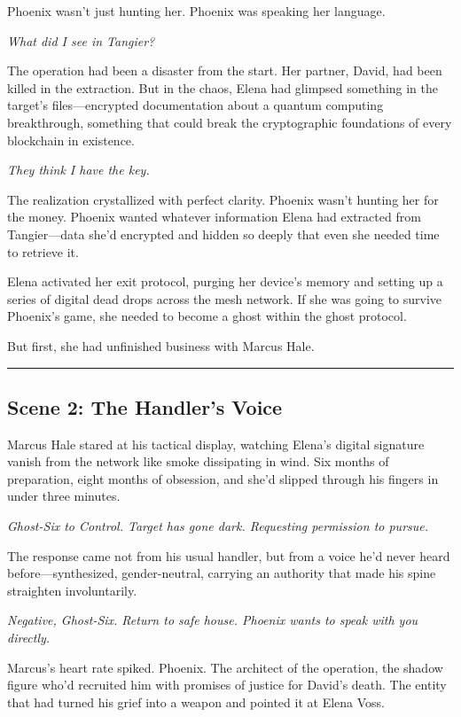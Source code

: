 Phoenix wasn't just hunting her. Phoenix was speaking her language.

\emph{What did I see in Tangier?}

The operation had been a disaster from the start. Her partner, David, had been killed in the extraction. But in the chaos, Elena had glimpsed something in the target's files---encrypted documentation about a quantum computing breakthrough, something that could break the cryptographic foundations of every blockchain in existence.

\emph{They think I have the key.}

The realization crystallized with perfect clarity. Phoenix wasn't hunting her for the money. Phoenix wanted whatever information Elena had extracted from Tangier---data she'd encrypted and hidden so deeply that even she needed time to retrieve it.

Elena activated her exit protocol, purging her device's memory and setting up a series of digital dead drops across the mesh network. If she was going to survive Phoenix's game, she needed to become a ghost within the ghost protocol.

But first, she had unfinished business with Marcus Hale.

\begin{center}\rule{0.5\linewidth}{0.5pt}\end{center}

\hypertarget{scene-2-the-handlers-voice}{%
\subsection{Scene 2: The Handler's Voice}\label{scene-2-the-handlers-voice}}

Marcus Hale stared at his tactical display, watching Elena's digital signature vanish from the network like smoke dissipating in wind. Six months of preparation, eight months of obsession, and she'd slipped through his fingers in under three minutes.

\emph{Ghost-Six to Control. Target has gone dark. Requesting permission to pursue.}

The response came not from his usual handler, but from a voice he'd never heard before---synthesized, gender-neutral, carrying an authority that made his spine straighten involuntarily.

\emph{Negative, Ghost-Six. Return to safe house. Phoenix wants to speak with you directly.}

Marcus's heart rate spiked. Phoenix. The architect of the operation, the shadow figure who'd recruited him with promises of justice for David's death. The entity that had turned his grief into a weapon and pointed it at Elena Voss.

